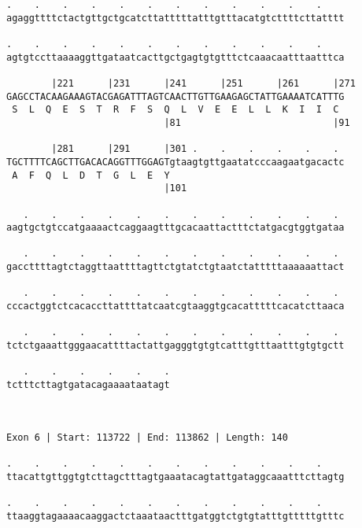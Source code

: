 \documentclass{article}
\begin{document}
\begin{Verbatim}
.    .    .    .    .    .    .    .    .    .    .    .    
agaggttttctactgttgctgcatcttatttttatttgtttacatgtcttttcttatttt
                                                            
.    .    .    .    .    .    .    .    .    .    .    .    
agtgtccttaaaaggttgataatcacttgctgagtgtgtttctcaaacaatttaatttca
                                                            
        |221      |231      |241      |251      |261      |271
GAGCCTACAAGAAAGTACGAGATTTAGTCAACTTGTTGAAGAGCTATTGAAAATCATTTG
 S  L  Q  E  S  T  R  F  S  Q  L  V  E  E  L  L  K  I  I  C 
                            |81                           |91
  
        |281      |291      |301 .    .    .    .    .    . 
TGCTTTTCAGCTTGACACAGGTTTGGAGTgtaagtgttgaatatcccaagaatgacactc
 A  F  Q  L  D  T  G  L  E  Y                               
                            |101                            
  
   .    .    .    .    .    .    .    .    .    .    .    . 
aagtgctgtccatgaaaactcaggaagtttgcacaattactttctatgacgtggtgataa
                                                            
   .    .    .    .    .    .    .    .    .    .    .    . 
gaccttttagtctaggttaattttagttctgtatctgtaatctatttttaaaaaattact
                                                            
   .    .    .    .    .    .    .    .    .    .    .    . 
cccactggtctcacaccttattttatcaatcgtaaggtgcacatttttcacatcttaaca
                                                            
   .    .    .    .    .    .    .    .    .    .    .    . 
tctctgaaattgggaacattttactattgagggtgtgtcatttgtttaatttgtgtgctt
                                                            
   .    .    .    .    .    .
tctttcttagtgatacagaaaataatagt
                             
                             
 
Exon 6 | Start: 113722 | End: 113862 | Length: 140
 
.    .    .    .    .    .    .    .    .    .    .    .    
ttacattgttggtgtcttagctttagtgaaatacagtattgataggcaaatttcttagtg
                                                            
.    .    .    .    .    .    .    .    .    .    .    .    
ttaaggtagaaaacaaggactctaaataactttgatggtctgtgtatttgtttttgtttc
                                                            

\end{Verbatim}
\end{document}

